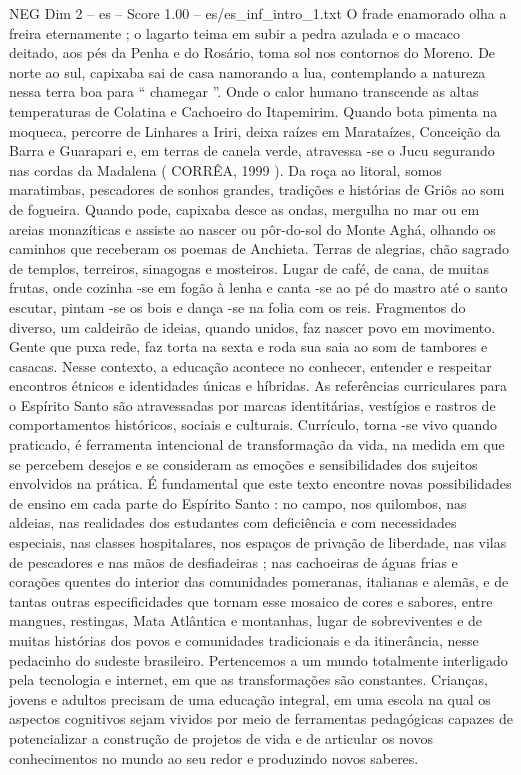 \begin{textsample}{NEG Dim 2 – es – Score 1.00 – es/es\_inf\_intro\_1.txt}
O frade enamorado olha a freira eternamente ; o lagarto teima em subir a pedra azulada e o macaco deitado, aos pés da Penha e do Rosário, toma sol nos contornos do Moreno.
De norte ao sul, capixaba sai de casa namorando a lua, contemplando a natureza nessa terra boa para “ chamegar ”.
Onde o calor humano transcende as altas temperaturas de Colatina e Cachoeiro do Itapemirim.
Quando bota pimenta na moqueca, percorre de Linhares a Iriri, deixa raízes em Marataízes, Conceição da Barra e Guarapari e, em terras de canela verde, atravessa -se o Jucu segurando nas cordas da Madalena ( CORRÊA, 1999 ).
Da roça ao litoral, somos maratimbas, pescadores de sonhos grandes, tradições e histórias de Griôs ao som de fogueira.
Quando pode, capixaba desce as ondas, mergulha no mar ou em areias monazíticas e assiste ao nascer ou pôr-do-sol do Monte Aghá, olhando os caminhos que receberam os poemas de Anchieta.
Terras de alegrias, chão sagrado de templos, terreiros, sinagogas e mosteiros.
Lugar de café, de cana, de muitas frutas, onde cozinha -se em fogão à lenha e canta -se ao pé do mastro até o santo escutar, pintam -se os bois e dança -se na folia com os reis.
Fragmentos do diverso, um caldeirão de ideias, quando unidos, faz nascer povo em movimento.
Gente que puxa rede, faz torta na sexta e roda sua saia ao som de tambores e casacas.
Nesse contexto, a educação acontece no conhecer, entender e respeitar encontros étnicos e identidades únicas e híbridas.
As referências curriculares para o Espírito Santo são atravessadas por marcas identitárias, vestígios e rastros de comportamentos históricos, sociais e culturais.
Currículo, torna -se vivo quando praticado, é ferramenta intencional de transformação da vida, na medida em que se percebem desejos e se consideram as emoções e sensibilidades dos sujeitos envolvidos na prática.
É fundamental que este texto encontre novas possibilidades de ensino em cada parte do Espírito Santo : no campo, nos quilombos, nas aldeias, nas realidades dos estudantes com deficiência e com necessidades especiais, nas classes hospitalares, nos espaços de privação de liberdade, nas vilas de pescadores e nas mãos de desfiadeiras ; nas cachoeiras de águas frias e corações quentes do interior das comunidades pomeranas, italianas e alemãs, e de tantas outras especificidades que tornam esse mosaico de cores e sabores, entre mangues, restingas, Mata Atlântica e montanhas, lugar de sobreviventes e de muitas histórias dos povos e comunidades tradicionais e da itinerância, nesse pedacinho do sudeste brasileiro.
Pertencemos a um mundo totalmente interligado pela tecnologia e internet, em que as transformações são constantes.
Crianças, jovens e adultos precisam de uma educação integral, em uma escola na qual os aspectos cognitivos sejam vividos por meio de ferramentas pedagógicas capazes de potencializar a construção de projetos de vida e de articular os novos conhecimentos no mundo ao seu redor e produzindo novos saberes.

\end{textsample}
